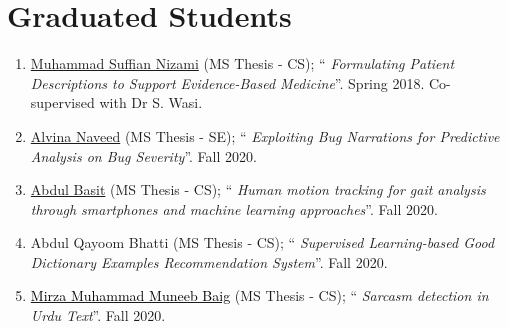 \documentclass[10pt]{article}
\begin{document}

\section*{\textcolor{NavyBlue}{Graduated Students}}
\begin{enumerate}
\itemsep=-.25em
\item \href{https://www.linkedin.com/in/msuffian/}{Muhammad Suffian Nizami} (MS Thesis - CS); ``\emph{ Formulating Patient Descriptions to Support Evidence-Based Medicine}''. Spring 2018. Co-supervised with Dr S. Wasi.

\item \href{https://www.linkedin.com/in/alvina-naveed-7832a0117/}{Alvina Naveed} (MS Thesis - SE); ``\emph{ Exploiting Bug Narrations for Predictive Analysis on Bug Severity}''. Fall 2020.

\item \href{https://www.linkedin.com/in/abdul-basit-a151b0b9/}{Abdul Basit} (MS Thesis - CS); ``\emph{ Human motion tracking for gait analysis through smartphones and machine learning approaches}''. Fall 2020.

\item Abdul Qayoom Bhatti (MS Thesis - CS); ``\emph{ Supervised Learning-based Good Dictionary Examples Recommendation System}''. Fall 2020.

\item \href{}{\textcolor{black}{Mirza Muhammad Muneeb Baig}} (MS Thesis - CS); ``\emph{ Sarcasm detection in Urdu Text}''. Fall 2020.
\end{enumerate}
\end{document}
